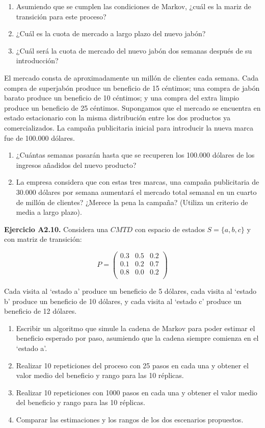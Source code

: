 \documentclass[
]{book}
\providecommand{\tightlist}{%
  \setlength{\itemsep}{0pt}\setlength{\parskip}{0pt}}
\theoremstyle{definition}
\theoremstyle{definition}
\theoremstyle{definition}
\theoremstyle{definition}
\theoremstyle{remark}
\begin{document}
\begin{enumerate}
\def\labelenumi{\arabic{enumi}.}
\tightlist
\item
  Asumiendo que se cumplen las condiciones de Markov, ¿cuál es la mariz de transición para este proceso?
\item
  ¿Cuál es la cuota de mercado a largo plazo del nuevo jabón?
\item
  ¿Cuál será la cuota de mercado del nuevo jabón dos semanas después de su introducción?
\end{enumerate}

El mercado consta de aproximadamente un millón de clientes cada semana. Cada compra de superjabón produce un beneficio de 15 céntimos; una compra de jabón barato produce un beneficio de 10 céntimos; y una compra del extra limpio produce un beneficio de 25 céntimos. Supongamos que el mercado se encuentra en estado estacionario con la misma distribución entre los dos productos ya comercializados. La campaña publicitaria inicial para introducir la nueva marca fue de 100.000 dólares.

\begin{enumerate}
\def\labelenumi{\arabic{enumi}.}
\setcounter{enumi}{3}
\tightlist
\item
  ¿Cuántas semanas pasarán hasta que se recuperen los 100.000 dólares de los ingresos añadidos del nuevo producto?
\item
  La empresa considera que con estas tres marcas, una campaña publicitaria de 30.000 dólares por semana aumentará el mercado total semanal en un cuarto de millón de clientes? ¿Merece la pena la campaña? (Utiliza un criterio de media a largo plazo).
\end{enumerate}

\textbf{Ejercicio A2.10.} Considera una \(CMTD\) con espacio de estados \(S=\{a, b, c\}\) y con matriz de transición:

\[P = 
\begin{pmatrix}
0.3 & 0.5 & 0.2\\
0.1 & 0.2 & 0.7\\
0.8 & 0.0 & 0.2\\
\end{pmatrix}\]

Cada visita al `estado a' produce un beneficio de 5 dólares, cada visita al `estado b' produce un beneficio de 10 dólares, y cada visita al `estado c' produce un beneficio de 12 dólares.

\begin{enumerate}
\def\labelenumi{\arabic{enumi}.}
\tightlist
\item
  Escribir un algoritmo que simule la cadena de Markov para poder estimar el beneficio esperado por paso, asumiendo que la cadena siempre comienza en el `estado a'.
\item
  Realizar 10 repeticiones del proceso con 25 pasos en cada una y obtener el valor medio del beneficio y rango para las 10 réplicas.
\item
  Realizar 10 repeticiones con 1000 pasos en cada una y obtener el valor medio del beneficio y rango para las 10 réplicas.
\item
  Comparar las estimaciones y los rangos de los dos escenarios propuestos.
\end{enumerate}
\end{document}
